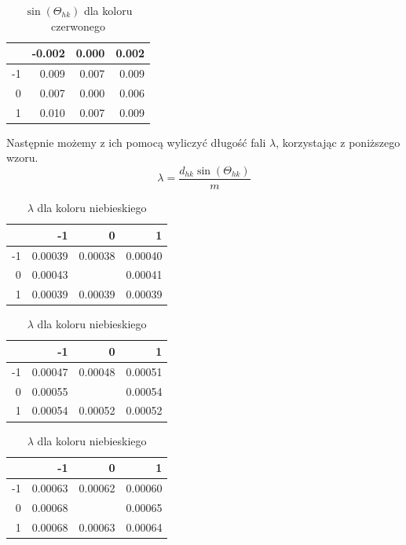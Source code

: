 \documentclass{article}
\begin{document}
\begin{table}[H]
\centering
\begin{tabular}{r|r|r|r}
\multicolumn{1}{l}{} & -0.002 & 0.000 & 0.002 \\ \hline
-1                   & 0.009  & 0.007 & 0.009 \\
0                    & 0.007  & 0.000 & 0.006 \\
1                    & 0.010  & 0.007 & 0.009
\end{tabular}
\caption{$\sin(\Theta_{hk})$ dla koloru czerwonego}
\end{table}
Następnie możemy z ich pomocą wyliczyć długość fali $\lambda$, korzystając z poniższego wzoru.
    $$\lambda = \frac{d_{hk}\sin(\Theta_{hk})}{m} $$
\begin{table}[H]
\centering
\begin{tabular}{r|rrr}
\multicolumn{1}{l|}{} & -1      & 0       & 1       \\ \hline
-1                    & 0.00039 & 0.00038 & 0.00040 \\
0                     & 0.00043 &  & 0.00041 \\
1                     & 0.00039 & 0.00039 & 0.00039 \\
\end{tabular}
\caption{$\lambda$ dla koloru niebieskiego}
\end{table}

\begin{table}[H]
\centering
\begin{tabular}{r|rrr}
\multicolumn{1}{l|}{} & -1      & 0       & 1       \\ \hline
-1                    & 0.00047 & 0.00048 & 0.00051 \\
0                     & 0.00055 &  & 0.00054 \\
1                     & 0.00054 & 0.00052 & 0.00052 \\
\end{tabular}
\caption{$\lambda$ dla koloru niebieskiego}
\end{table}

\begin{table}[H]
\centering
\begin{tabular}{r|rrr}
\multicolumn{1}{l|}{} & -1      & 0       & 1       \\ \hline
-1                    & 0.00063 & 0.00062 & 0.00060 \\
0                     & 0.00068 &  & 0.00065 \\
1                     & 0.00068 & 0.00063 & 0.00064
\end{tabular}
\caption{$\lambda$ dla koloru niebieskiego}
\end{table}
\end{document}
